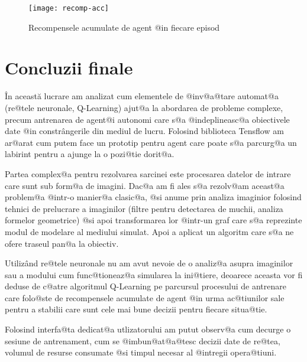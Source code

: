 \begin{figure}[h]
	\centering
	\texttt{[image: recomp-acc]}
	\caption{Recompensele acumulate de agent @in fiecare episod}
	\label{fig:recomp-acc}
\end{figure}










\chapter*{Concluzii finale}



\^ In aceast\u a lucrare am analizat cum elementele de @inv@a@tare automat@a (re@tele neuronale, Q-Learning) ajut@a la abordarea de probleme complexe, precum antrenarea de agent@i autonomi care s@a @indeplineasc@a obiectivele date @in constr\^ angerile din mediul de lucru. Folosind biblioteca Tensflow am ar@arat cum putem face un prototip pentru agent care poate s@a parcurg@a un labirint pentru a ajunge la o pozi@tie dorit@a. 

Partea complex@a pentru rezolvarea sarcinei este procesarea datelor de intrare care sunt sub form@a de imagini. Dac@a am fi ales s@a rezolv@am aceast@a problem@a @intr-o manier@a clasic@a, @si anume prin analiza imaginior folosind tehnici de prelucrare a imaginilor (filtre pentru detectarea de muchii, analiza formelor geometrice) @si apoi transformarea lor @intr-un graf care s@a reprezinte modul de modelare al mediului simulat. Apoi a aplicat un algoritm care s@a ne ofere traseul pan@a la obiectiv.

Utiliz\^ and re@tele neuronale nu am avut nevoie de o analiz@a asupra imaginilor sau a modului cum func@tioneaz@a simularea la ini@tiere, deoarece aceasta vor fi deduse de c@atre algoritmul Q-Learning pe parcursul procesului de antrenare care folo@ste de recompensele acumulate de agent @in urma ac@tiunilor sale pentru a stabilii care sunt cele mai bune decizii pentru fiecare situa@tie.

Folosind interfa@ta dedicat@a utlizatorului am putut observ@a cum decurge o sesiune de antrenament, cum se @imbun@at@a@tesc decizii date de re@tea, volumul de resurse consumate @si timpul necesar al @intregii opera@tiuni.

